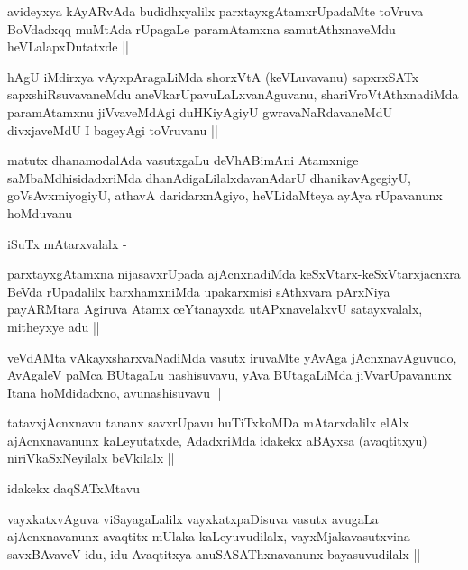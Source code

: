\begin{artha}
avideyxya kAyARvAda budidhxyalilx parxtayxgAtamxrUpadaMte toVruva
BoVdadxqq muMtAda rUpagaLe paramAtamxna samutAthxnaveMdu
heVLalapxDutatxde ||
\end{artha}

\begin{artha}
hAgU iMdirxya vAyxpAragaLiMda shorxVtA (keVLuvavanu) sapxrxSATx
sapxshiRsuvavaneMdu aneVkarUpavuLaLxvanAguvanu, shariVroVtAthxnadiMda
paramAtamxnu jiVvaveMdAgi duHKiyAgiyU gwravaNaRdavaneMdU divxjaveMdU I
bageyAgi toVruvanu ||
\end{artha}

\begin{artha}
matutx dhanamodalAda vasutxgaLu deVhABimAni Atamxnige
saMbaMdhisidadxriMda dhanAdigaLilalxdavanAdarU dhanikavAgegiyU,
goVsAvxmiyogiyU, athavA daridarxnAgiyo, heVLidaMteya ayAya rUpavanunx
hoMduvanu

iSuTx mAtarxvalalx -
\end{artha}

\begin{artha}
parxtayxgAtamxna nijasavxrUpada ajAcnxnadiMda
keSxVtarx-keSxVtarxjacnxra BeVda rUpadalilx barxhamxniMda upakarxmisi
sAthxvara pArxNiya payARMtara Agiruva Atamx ceYtanayxda
utAPxnavelalxvU satayxvalalx, mitheyxye adu ||
\end{artha}

\begin{artha}
veVdAMta vAkayxsharxvaNadiMda vasutx iruvaMte yAvAga jAcnxnavAguvudo,
AvAgaleV paMca BUtagaLu nashisuvavu, yAva BUtagaLiMda jiVvarUpavanunx
Itana hoMdidadxno, avunashisuvavu ||
\end{artha}


\begin{artha}
tatavxjAcnxnavu tananx savxrUpavu huTiTxkoMDa mAtarxdalilx elAlx
ajAcnxnavanunx kaLeyutatxde, AdadxriMda idakekx aBAyxsa (avaqtitxyu)
niriVkaSxNeyilalx beVkilalx ||
\end{artha}

\begin{artha}
idakekx daqSATxMtavu
\end{artha}

\begin{artha}
vayxkatxvAguva viSayagaLalilx vayxkatxpaDisuva vasutx avugaLa
ajAcnxnavanunx avaqtitx mUlaka kaLeyuvudilalx, vayxMjakavasutxvina
savxBAvaveV idu, idu Avaqtitxya anuSASAThxnavanunx bayasuvudilalx ||
\end{artha}

